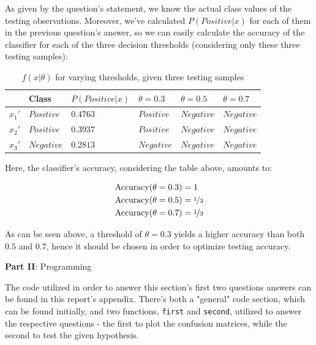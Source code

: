 \documentclass[12pt]{article}
\begin{document}
\begin{enumerate}[leftmargin=\labelsep]
  As given by the question's statement, we know the actual class values of the testing observations.
  Moreover, we've calculated $P(Positive | x)$ for each of them in the previous question's answer,
  so we can easily calculate the accuracy of the classifier for each of the three decision thresholds
  (considering only these three testing samples):

  \begin{table}[h]
    \centering
    \begin{tabular}{l|l|l|l|l|l}
    \hline
           & Class      & $P(Positive | x)$ & $\theta = 0.3$ & $\theta = 0.5$ & $\theta = 0.7$ \\ \hline
    $x_1'$ & $Positive$ & $0.4763$           & $Positive$     & $Negative$     & $Negative$     \\ \hline
    $x_2'$ & $Positive$ & $0.3937$           & $Positive$     & $Negative$     & $Negative$     \\ \hline
    $x_3'$ & $Negative$ & $0.2813$         & $Negative$     & $Negative$     & $Negative$     \\ \hline
    \end{tabular}
    \caption{$f(x | \theta)$ for varying thresholds, given three testing samples}
    \label{tab:thresholds}
  \end{table}

  Here, the classifier's accuracy, considering the table above, amounts to:

  \begin{align*}
    \text{Accuracy}(\theta = 0.3) &= 1 \\
    \text{Accuracy}(\theta = 0.5) &= \nicefrac{1}{3} \\
    \text{Accuracy}(\theta = 0.7) &= \nicefrac{1}{3}
  \end{align*}

  As can be seen above, a threshold of $\theta = 0.3$ yields a higher accuracy than
  both $0.5$ and $0.7$, hence it should be chosen in order to optimize testing accuracy.

\end{enumerate}

\pagebreak

\center\large{\textbf{Part II}: Programming}

The code utilized in order to answer this section's first two questions answers
can be found in this report's appendix. There's both a "general" code section,
which can be found initially, and two functions, \texttt{first} and \texttt{second},
utilized to answer the respective questions - the first to plot the confusion matrices,
while the second to test the given hypothesis.
\end{document}

